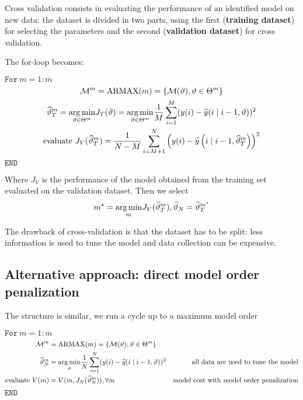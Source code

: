Cross validation consists in evaluating the performance of an identified model on new data: the dataset is divided in two parts, using the first (\textbf{training dataset}) for selecting the parameters and the second (\textbf{validation dataset}) for cross validation.

The for-loop becomes:

$ \mathtt{For } \ m=1:\overline{m}$
\begin{gather*}
\mathcal{M}^{m} =\text{ARMAX}(m) =\left\{\mathcal{M}(\vartheta) ,\vartheta \in \Theta ^{m}\right\}\\
\widehat{\vartheta }_{T}^{m} =\underset{\vartheta \in \Theta ^{m}}{\operatorname*{arg\,min}} J_{T}(\vartheta) =\underset{\vartheta \in \Theta ^{m}}{\operatorname*{arg\,min}}\frac{1}{M}\sum _{i=1}^{M}(y(i) -\widehat{y}(i\mid i-1,\vartheta))^{2}\\
\text{evaluate } J_{V}(\widehat{\vartheta }_{T}^{m}) =\frac{1}{N-M}\sum _{i=M+1}^{N}\left(y(i) -\widehat{y}\left(i\mid i-1,\widehat{\vartheta }_{T}^{m}\right)\right)^{2}
\end{gather*}
$ \mathtt{END}$

Where $ J_{V}$ is the performance of the model obtained from the training set evaluated on the validation dataset. Then we select
\begin{equation*}
m^{\star} =\underset{m}{\operatorname*{arg\,min}} J_{V}(\widehat{\vartheta }_{T}^{m}) ,\widehat{\vartheta }_{N} =\widehat{\vartheta }_{T}^{m^{\star}}
\end{equation*}

The drawback of cross-validation is that the dataset has to be split: less information is used to tune the model and data collection can be expensive.


\subsection{Alternative approach: direct model order penalization}
The structure is similar, we run a cycle up to a maximum model order

$ \mathtt{For } \ m=1:\overline{m}$
\begin{equation*}
\begin{aligned}
\mathcal{M}^{m} & =\text{ARMAX}(m) =\left\{\mathcal{M}(\vartheta) ,\vartheta \in \Theta ^{m}\right\} & \\
\widehat{\vartheta }_{N}^{m}  & =\underset{\vartheta }{\operatorname*{arg\,min}}\frac{1}{N}\sum _{i=1}^{N}(y(i) -\widehat{y}(i\mid i-1,\vartheta))^{2} & \text{all data are used to tune the model}\\
\text{evaluate } V(m) & =V(m,J_{N}(\widehat{\vartheta }_{N}^{m})),\forall m & \text{model cost with model order penalization}
\end{aligned}
\end{equation*}
$ \mathtt{END}$

